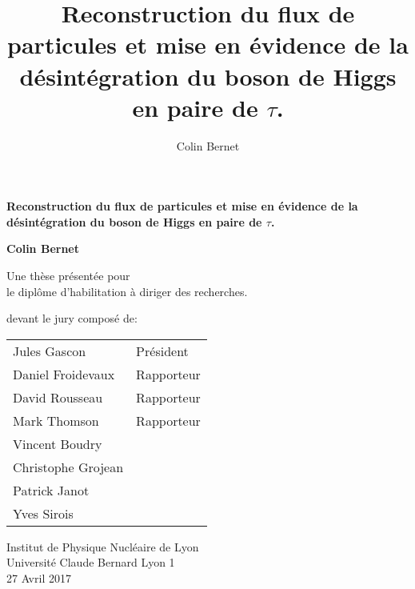 \documentclass[11pt,twoside,a4paper,tdr]{cms-tdr}
\begin{document}
\title{Reconstruction du flux de particules et mise en évidence de la désintégration du boson de Higgs en paire de $\tau$.}
\author{Colin Bernet}

\begin{titlepage}
    \begin{center}
        \vspace*{1cm}
        
        \Huge
        \textbf{Reconstruction du flux de particules et mise en évidence de la désintégration du boson de Higgs en paire de $\tau$.}
        
        \vspace{0.5cm}
        \LARGE
        
        \vspace{1.5cm}
        
        \textbf{Colin Bernet}
        
        \vfill
        
        Une thèse présentée pour \\
        le diplôme d'habilitation à diriger des recherches.

        devant le jury composé de: \\
        
        \vspace{1.5cm}
        
        \large
        \begin{tabular}{ll}
          Jules Gascon & Président \\ 
          Daniel Froidevaux & Rapporteur \\
          David Rousseau & Rapporteur \\
          Mark Thomson & Rapporteur \\ 
          Vincent Boudry & \\ 
          Christophe Grojean & \\ 
          Patrick Janot & \\ 
          Yves Sirois & \\ 
          
        \end{tabular}
        
        \vspace{0.8cm}
        
        
        \Large
        Institut de Physique Nucléaire de Lyon \\
        Université Claude Bernard Lyon 1 \\
        27 Avril 2017
        
    \end{center}
\end{titlepage}
\end{document}
